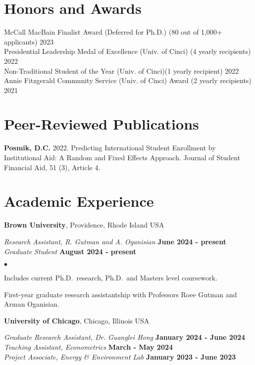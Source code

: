 \documentclass[margin,line]{res}
\newenvironment{list2}{
  \begin{list}{$\bullet$}{%
      \setlength{\itemsep}{0in}
      \setlength{\parsep}{0in} \setlength{\parskip}{0in}
      \setlength{\topsep}{0in} \setlength{\partopsep}{0in} 
      \setlength{\leftmargin}{0.2in}}}{\end{list}}
\begin{document}
\begin{resume}
\section{\sc Honors and Awards} 
McCall MacBain Finalist Award (Deferred for Ph.D.) (80 out of 1,000+ applicants) \hfill 2023 \\  
Presidential Leadership Medal of Excellence (Univ. of Cinci) (4 yearly recipients) \hfill 2022 \\ 
Non-Traditional Student of the Year (Univ. of Cinci)(1 yearly recipient) \hfill 2022 \\
Annie Fitzgerald Community Service (Univ. of Cinci) Award (2 yearly recipients) \hfill 2021


\section{\sc Peer-Reviewed Publications}
{\bf Posmik, D.C.} 2022. Predicting International Student Enrollment by Institutional Aid: A Random and Fixed Effects Approach. Journal of Student Financial Aid, 51 (3), Article 4.  


\section{\sc Academic Experience}
{\bf Brown University}, Providence, Rhode Island USA

\vspace{-.3cm}
{\em Research Assistant, R. Gutman and A. Oganisian} \hfill {\bf June 2024 - present}\\
{\em Graduate Student} \hfill {\bf August 2024 - present}\\

\begin{list2}
\item Includes current Ph.D.~research, Ph.D.~and Masters level coursework. 
\item First-year graduate research assistantship with Professors Roee Gutman and Arman Oganisian.
\end{list2}

{\bf University of Chicago}, Chicago, Illinois USA

\vspace{-.3cm}
{\em Graduate Research Assistant, Dr. Guanglei Hong} \hfill {\bf January 2024 - June 2024}\\
{\em Teaching Assistant, Econometrics} \hfill {\bf March - May 2024}\\
{\em Project Associate, Energy \& Environment Lab} \hfill {\bf January 2023 - June 2023}\\


\end{resume}
\end{document}
